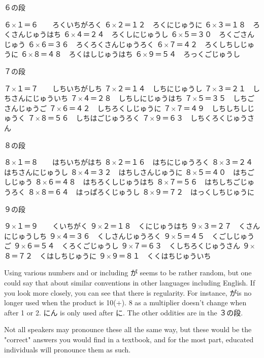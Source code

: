 \par{６の段 }

\par{６×１＝６　　ろくいちがろく \hfill\break
６×２＝１２　ろくにじゅうに \hfill\break
６×３＝１８　ろくさんじゅうはち \hfill\break
６×４＝２４　ろくしにじゅうし \hfill\break
６×５＝３０　ろくごさんじゅう \hfill\break
６×６＝３６　ろくろくさんじゅうろく \hfill\break
６×７＝４２　ろくしちしじゅうに \hfill\break
６×８＝４８　ろくはしじゅうはち \hfill\break
６×９＝５４　ろっくごじゅうし }

\par{７の段 }

\par{７×１＝７　　しちいちがしち \hfill\break
７×２＝１４　しちにじゅうし \hfill\break
７×３＝２１　しちさんにじゅういち \hfill\break
７×４＝２８　しちしにじゅうはち \hfill\break
７×５＝３５　しちごさんじゅうご \hfill\break
７×６＝４２　しちろくしじゅうに \hfill\break
７×７＝４９　しちしちしじゅうく \hfill\break
７×８＝５６　しちはごじゅうろく \hfill\break
７×９＝６３　しちくろくじゅうさん }

\par{８の段 }

\par{８×１＝８　　はちいちがはち \hfill\break
８×２＝１６　はちにじゅうろく \hfill\break
８×３＝２４　はちさんにじゅうし \hfill\break
８×４＝３２　はちしさんじゅうに \hfill\break
８×５＝４０　はちごしじゅう \hfill\break
８×６＝４８　はちろくしじゅうはち \hfill\break
８×７＝５６　はちしちごじゅうろく \hfill\break
８×８＝６４　はっぱろくじゅうし \hfill\break
８×９＝７２　はっくしちじゅうに }

\par{９の段 }

\par{９×１＝９　　くいちがく \hfill\break
９×２＝１８　くにじゅうはち \hfill\break
９×３＝２７　くさんにじゅうしち \hfill\break
９×４＝３６　くしさんじゅうろく \hfill\break
９×５＝４５　くごしじゅうご \hfill\break
９×６＝５４　くろくごじゅうし \hfill\break
９×７＝６３　くしちろくじゅうさん \hfill\break
９×８＝７２　くはしちじゅうに \hfill\break
９×９＝８１　くくはちじゅういち }

\par{ Using various numbers and or including が seems to be rather random, but one could say that about similar conventions in other languages including English. If you look more closely, you can see that there is regularity. For instance, がis no longer used when the product is 10(+). 8 as a multiplier doesn't change when after 1 or 2. にん is only used after に. The other oddities are in the ３の段. }

\par{ Not all speakers may pronounce these all the same way, but these would be the "correct" answers you would find in a textbook, and for the most part, educated individuals will pronounce them as such. }
    